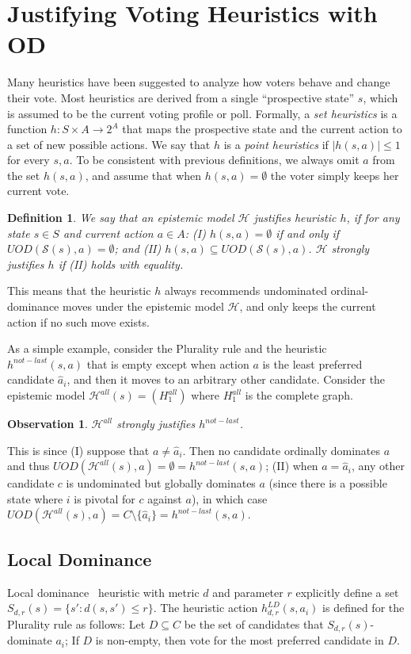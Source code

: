 \documentclass[letterpaper]{article} %
\def\calS{\mathcal{S}}
\def\calH{\mathcal{H}}
\newtheorem{definition}{Definition}
\newtheorem{observation}[theorem]{Observation}
\begin{document}
\section{Justifying Voting Heuristics with OD}\label{sec:heuristics}

Many heuristics have been suggested to analyze how voters behave and change their vote. 
Most heuristics are derived from a single ``prospective state'' $s$, which is assumed to be the current voting profile or poll. Formally, a \emph{set heuristics} is a function $h:S\times A \rightarrow 2^A$ that maps the prospective state and the current action to a set of new possible actions. We say that $h$ is a \emph{point heuristics} if $|h(s,a)|\leq 1$ for every $s,a$. To be consistent with previous definitions, we always omit $a$ from the set $h(s,a)$, and assume that when $h(s,a)=\emptyset$ the voter simply keeps her current vote. 

\begin{definition} We say that an epistemic model $\calH$ \emph{justifies} heuristic $h$, 
if for any state $s\in S$ and current action $a\in A$: 
 (I) $h(s,a)=\emptyset$ if and only if $UOD(\calS(s),a)=\emptyset$; and (II) $h(s,a)\subseteq UOD(\calS(s),a)$.
$\calH$ \emph{strongly justifies} $h$ if (II) holds with equality.
\end{definition}
This means that the heuristic $h$ always recommends undominated ordinal-dominance moves under the epistemic model $\calH$, and only keeps the current action if no such move exists. 

As a simple example, consider the Plurality rule and the heuristic $h^{not-last}(s,a)$ that is empty except when action $a$ is the least preferred candidate $\hat a_i$, and then it moves to an arbitrary other candidate. 
Consider the epistemic model $\calH^{all}(s) = (H^{all}_1)$ where $H^{all}_1$ is the complete graph. 

\begin{observation} $\calH^{all}$ strongly justifies $h^{not-last}$.
\end{observation}
This is since (I) suppose that $a\neq \hat a_i$. Then no candidate ordinally dominates $a$ and thus $UOD(\calH^{all}(s),a)=\emptyset=h^{not-last}(s,a)$; (II) when $a=\hat a_i$, any other candidate $c$ is undominated but globally dominates $a$ (since there is a possible state where $i$ is pivotal for $c$ against $a$), in which case $UOD(\calH^{all}(s),a)=C\setminus\{\hat a_i\}=h^{not-last}(s,a)$.

 
\subsection{Local Dominance}\label{sec:h_LD}
Local dominance~\cite{MLR14} heuristic with metric $d$ and parameter $r$ explicitly define a set $S_{d,r}(s)=\{s' : d(s,s')\leq r\}$. The heuristic action $h^{LD}_{d,r}(s,a_i)$ is defined for the Plurality rule as follows: Let $D\subseteq C$ be the set of candidates that $S_{d,r}(s)$-dominate $a_i$; If $D$ is non-empty, then vote for the most preferred candidate in $D$.
\end{document}
